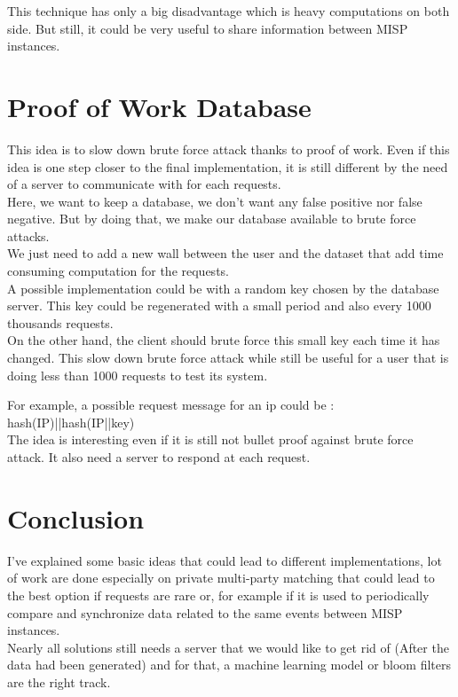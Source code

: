 \documentclass{eplmastersthesis}
\begin{document}
This technique has only a big disadvantage which is heavy computations on both side. But still, it could be very useful to share information between MISP instances.

\section{Proof of Work Database}
This idea is to slow down brute force attack thanks to proof of work. Even if this idea is one step closer to the final implementation, it is still different by the need of a server to communicate with for each requests.\\

Here, we want to keep a database, we don't want any false positive nor false negative. But by doing that, we make our database available to brute force attacks.\\
We just need to add a new wall between the user and the dataset that add time consuming computation for the requests.\\

A possible implementation could be with a random key chosen by the database server. This key could be regenerated with a small period and also every 1000 thousands requests.\\
On the other hand, the client should brute force this small key each time it has changed. This slow down brute force attack while still be useful for a user that is doing less than 1000 requests to test its system.

For example, a possible request message for an ip could be : hash(IP)||hash(IP||key)\\

The idea is interesting even if it is still not bullet proof against brute force attack. It also need a server to respond at each request.

\section{Conclusion}
I've explained some basic ideas that could lead to different implementations, lot of work are done especially on private multi-party matching that could lead to the best option if requests are rare or, for example if it is used to periodically compare and synchronize data related to the same events between MISP instances.\\
Nearly all solutions still needs a server that we would like to get rid of (After the data had been generated) and for that, a machine learning model or bloom filters are the right track.
\end{document}
